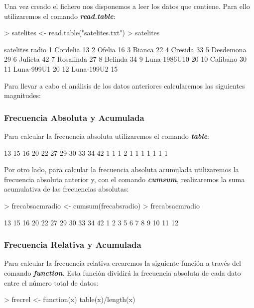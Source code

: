 \documentclass [a4paper] {article}
\begin{document}
Una vez creado el fichero nos disponemos a leer los datos que contiene. Para ello utilizaremos el comando \textbf{\textit{read.table}}:
\newpage
\begin{Schunk}
\begin{Sinput}
> satelites <- read.table("satelites.txt")
> satelites
\end{Sinput}
\begin{Soutput}
      satelites radio
1      Cordelia    13
2        Ofelia    16
3        Bianca    22
4       Cresida    33
5     Desdemona    29
6       Julieta    42
7     Rosalinda    27
8       Belinda    34
9  Luna-1986U10    20
10     Calibano    30
11   Luna-999U1    20
12   Luna-199U2    15
\end{Soutput}
\end{Schunk}

Para llevar a cabo el análisis de los datos anteriores calcularemos las siguientes magnitudes:
\subsubsection{Frecuencia Absoluta y Acumulada}
Para calcular la frecuencia absoluta utilizaremos el comando \textbf{\textit{table}}:
\begin{Schunk}
\begin{Soutput}
13 15 16 20 22 27 29 30 33 34 42 
 1  1  1  2  1  1  1  1  1  1  1 
\end{Soutput}
\end{Schunk}
Por otro lado, para calcular la frecuencia absoluta acumulada utilizaremos la frecuencia absoluta anterior y, con el comando \textbf{\textit{cumsum}}, realizaremos la suma acumulativa de las frecuencias absolutas:
\begin{Schunk}
\begin{Sinput}
> frecabsacmradio <- cumsum(frecabsradio)
> frecabsacmradio
\end{Sinput}
\begin{Soutput}
13 15 16 20 22 27 29 30 33 34 42 
 1  2  3  5  6  7  8  9 10 11 12 
\end{Soutput}
\end{Schunk}
\newpage
\subsubsection{Frecuencia Relativa y Acumulada}
Para calcular la frecuencia relativa crearemos la siguiente función a través del comando \textbf{\textit{function}}. Esta función dividirá la frecuencia absoluta de cada dato entre el número total de datos:
\begin{Schunk}
\begin{Sinput}
> frecrel <- function(x) {table(x)/length(x)}
\end{Sinput}
\end{Schunk}
\end{document}
